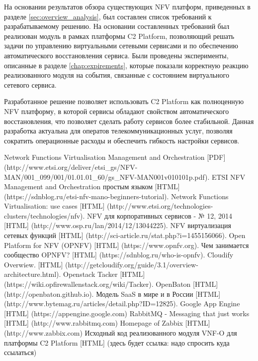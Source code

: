 \documentclass[oneside,final,14pt,a4paper]{extreport}
\begin{document}
На основании результатов обзора существующих NFV платформ, приведенных в разделе \ref{sec:overview_analysis}, был составлен список требований к разрабатываемому решению. На основании составленных требований был реализован модуль в рамках платформы C2 Platform, позволяющий решать задачи по управлению виртуальными сетевыми сервисами и по обеспечению автоматического восстановления сервиса. Были проведены эксперименты, описанные в разделе \ref{chap:expirements}, которые показали корректную реакцию реализованного модуля на события, связанные с состоянием виртуального сетевого сервиса.

Разработанное решение позволяет использовать C2 Platform как полноценную NFV платформу, в которой сервисы обладают свойством автоматического восстановления, что позволяет сделать работу сервисов более стабильной. Данная разработка актуальна для оператов телекоммуникационных услуг, позволяя сократить операционные расходы и обеспечить гибкость настройки сервисов.





\begin{thebibliography}{00}
 Network Functions Virtualisation Management and Orchestration [PDF] (http://www.etsi.org/deliver/etsi\_gs/NFV-MAN/001\_099/001/01.01.01\_60/gs\_NFV-MAN001v010101p.pdf).
 ETSI NFV Management and Orchestration простым языком [HTML] (https://sdnblog.ru/etsi-nfv-mano-beginners-tutorial).
 Network Functions Virtualisation: use cases [HTML] (http://www.etsi.org/technologies-clusters/technologies/nfv).
 NFV для корпоративных сервисов - № 12, 2014 [HTML] (http://www.osp.ru/lan/2014/12/13044225).
 NFV виртуализация сетевых функций [HTML] (http://sci-article.ru/stat.php?i=1455156066).
 Open Platform for NFV (OPNFV) [HTML] (https://www.opnfv.org).
 Чем занимается сообщество OPNFV? [HTML] (https://sdnblog.ru/who-is-opnfv).
 Cloudify Overwiew. [HTML] (http://getcloudify.org/guide/3.1/overview-architecture.html).
 Openstack Tacker [HTML] (https://wiki.opfirewallenstack.org/wiki/Tacker).
 OpenBaton [HTML] (http://openbaton.github.io).
 Модель SaaS в мире и в России [HTML] (http://www.bytemag.ru/articles/detail.php?ID=12825).
 Google App Engine [HTML] (https://appengine.google.com)
 RabbitMQ - Messaging that just works [HTML] (http://www.rabbitmq.com)
 Homepage of Zabbix [HTML] (http://www.zabbix.com)
 Исходный код реализованного модуля VNF-O для платформы C2 Platform [HTML] (здесь будет ссылка: надо спросить куда ссылаться)
\end{thebibliography}

\end{document}

